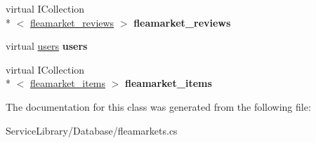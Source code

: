 \begin{DoxyCompactItemize}
\item 
\hypertarget{class_service_library_1_1_database_1_1fleamarkets_a4f3f79c7b961e664e7d92fa2a7c112aa}{virtual I\-Collection\\*
$<$ \hyperlink{class_service_library_1_1_database_1_1fleamarket__reviews}{fleamarket\-\_\-reviews} $>$ {\bfseries fleamarket\-\_\-reviews}}\label{class_service_library_1_1_database_1_1fleamarkets_a4f3f79c7b961e664e7d92fa2a7c112aa}

\item 
\hypertarget{class_service_library_1_1_database_1_1fleamarkets_a62281e43603d4a180857b3df05e7d8c7}{virtual \hyperlink{class_service_library_1_1_database_1_1users}{users} {\bfseries users}}\label{class_service_library_1_1_database_1_1fleamarkets_a62281e43603d4a180857b3df05e7d8c7}

\item 
\hypertarget{class_service_library_1_1_database_1_1fleamarkets_ae3be6ec0aa7a2aa5dba034146d75886d}{virtual I\-Collection\\*
$<$ \hyperlink{class_service_library_1_1_database_1_1fleamarket__items}{fleamarket\-\_\-items} $>$ {\bfseries fleamarket\-\_\-items}}\label{class_service_library_1_1_database_1_1fleamarkets_ae3be6ec0aa7a2aa5dba034146d75886d}

\end{DoxyCompactItemize}


The documentation for this class was generated from the following file\-:\begin{DoxyCompactItemize}
\item 
Service\-Library/\-Database/fleamarkets.\-cs\end{DoxyCompactItemize}

